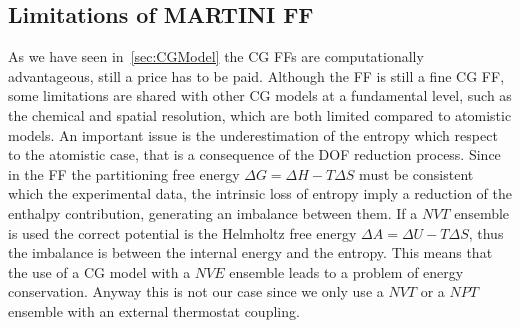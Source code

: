 
\subsection{Limitations of MARTINI FF}
As we have seen in~\ref{sec:CGModel} the \ac{CG} \acp{FF} are computationally advantageous, still a price has to
be paid. Although the \martini \ac{FF} is still a fine \ac{CG} \ac{FF}, some limitations are shared with other
\ac{CG} models at a fundamental level, such as the chemical and spatial resolution, which are both limited
compared to atomistic models. An important issue is the underestimation of the entropy which respect to the
atomistic case, that is a consequence of the \ac{DOF} reduction process. Since in the \martini \ac{FF} the
partitioning free energy $\Delta G = \Delta H - T\Delta S$ must be consistent which the experimental data, the
intrinsic loss of entropy imply a reduction of the enthalpy contribution, generating an imbalance between them.
If a $NVT$ ensemble is used the correct potential is the Helmholtz free energy $\Delta A = \Delta U - T\Delta S$,
thus the imbalance is between the internal energy and the entropy. This means that the use of a \ac{CG} model
with a $NVE$ ensemble leads to a problem of energy conservation. Anyway this is not our case since we only use a
$NVT$ or a $NPT$ ensemble with an external thermostat coupling.


